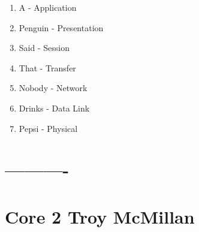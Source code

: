 \documentclass{article}
\begin{document}
\begin{enumerate}
    \item A - Application 
    \item Penguin - Presentation 
    \item Said - Session 
     \item That - Transfer
    \item Nobody - Network 
     \item Drinks - Data Link
    \item Pepsi  - Physical 
\end{enumerate}
\section{----------}
\section{Core 2 Troy McMillan} 
\end{document}
